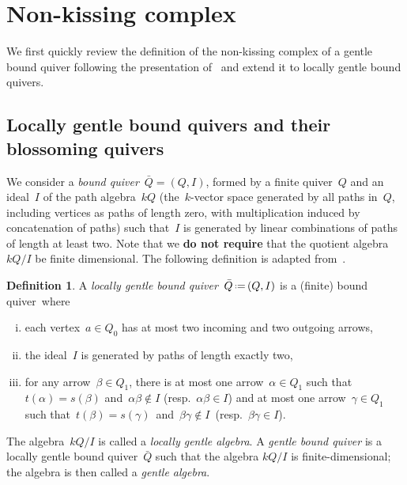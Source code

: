 \documentclass{amsart}
\theoremstyle{definition}
\newtheorem{definition}[theorem]{Definition}
\newcommand{\eqdef}{\mbox{\,\raisebox{0.2ex}{\scriptsize\ensuremath{\mathrm:}}\ensuremath{=}\,}} %
\newcommand{\darkblue}{\color{darkblue}} %
\newcommand{\defn}[1]{\textsl{\darkblue #1}} %
\begin{document}
\section{Non-kissing complex}\label{sec:nonKissingComplex}

We first quickly review the definition of the non-kissing complex of a gentle bound quiver following the presentation of~\cite{PaluPilaudPlamondon} and extend it to locally gentle bound quivers.

\subsection{Locally gentle bound quivers and their blossoming quivers}

We consider a \defn{bound quiver}~$\bar Q = (Q,I)$, formed by a finite quiver~$Q$ and an ideal~$I$ of the path algebra~$kQ$ (the~$k$-vector space generated by all paths in~$Q$, including vertices as paths of length zero, with multiplication induced by concatenation of paths) such that~$I$ is generated by linear combinations of paths of length at least two.
Note that we \textbf{do not require} that the quotient algebra~$kQ/I$ be finite dimensional.
The following definition is adapted from~\cite{ButlerRingel}.

\begin{definition}%
\label{def:gentleQuiver}
A \defn{locally gentle bound quiver}~$\bar Q \eqdef (Q,I)$ is a (finite) bound quiver~where
\begin{enumerate}[(i)]
\item each vertex~$a \in Q_0$ has at most two incoming and two outgoing arrows,
\item the ideal~$I$ is generated by paths of length exactly two,
\item for any arrow~$\beta \in Q_1$, there is at most one arrow~$\alpha \in Q_1$ such that~$t(\alpha) = s(\beta)$ and~${\alpha\beta\notin I}$ (resp.~$\alpha\beta \in I$) and at most one arrow~$\gamma \in Q_1$ such that~$t(\beta) = s(\gamma)$~and~${\beta\gamma\notin I}$~(resp.~${\beta\gamma \in I}$).
\end{enumerate}
The algebra~$kQ/I$ is called a \defn{locally gentle algebra}.
A \defn{gentle bound quiver} is a locally gentle bound quiver~$\bar Q$ such that the algebra $kQ/I$ is finite-dimensional; the algebra is then called a \defn{gentle algebra}.
\end{definition}
\end{document}
